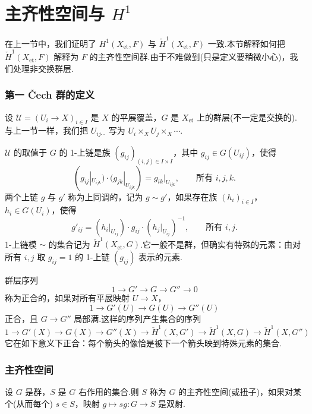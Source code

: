 ﻿%
\chapter{\texorpdfstring{主齐性空间与 $H^{1}$}{主齐性空间与 H1}}\label{sec:11}

在上一节中，我们证明了 $H^{1}(X_{\mathrm{et}}, F)$ 与 $\check{H}^{1}(X_{\mathrm{et}}, F)$ 一致.本节解释如何把 $\check{H}^{1}(X_{\mathrm{et}}, F)$ 解释为 $F$ 的主齐性空间群.由于不难做到(只是定义要稍微小心)，我们处理非交换群层.

\subsection*{第一 \v{C}ech 群的定义}

设 $\mathcal{U} = (U_i \to X)_{i \in I}$ 是 $X$ 的平展覆盖，$G$ 是 $X_{\mathrm{et}}$ 上的群层(不一定是交换的).与上一节一样，我们把 $U_{ij\cdots}$ 写为 $U_i \times_{X} U_j \times_{X} \cdots$.

$\mathcal{U}$ 的取值于 $G$ 的 1-上链是族 $(g_{ij})_{(i,j) \in I \times I}$，其中 $g_{ij} \in G(U_{ij})$，使得
\[
(g_{ij}|_{U_{ijk}}) \cdot (g_{jk}|_{U_{ijk}}) = g_{ik}|_{U_{ijk}}, \qquad \text{所有 } i, j, k.
\]
两个上链 $g$ 与 $g'$ 称为上同调的，记为 $g \sim g'$，如果存在族 $(h_i)_{i \in I}$，$h_i \in G(U_i)$，使得
\[
g'_{ij} = (h_i|_{U_{ij}}) \cdot g_{ij} \cdot (h_j|_{U_{ij}})^{-1}, \qquad \text{所有 } i, j.
\]
1-上链模 $\sim$ 的集合记为 $\check{H}^{1}(X_{\mathrm{et}}, G)$.它一般不是群，但确实有特殊的元素：由对所有 $i, j$ 取 $g_{ij} = 1$ 的 1-上链 $(g_{ij})$ 表示的元素.

群层序列
\[
1 \to G' \to G \to G'' \to 0
\]
称为正合的，如果对所有平展映射 $U \to X$，
\[
1 \to G'(U) \to G(U) \to G''(U)
\]
正合，且 $G \to G''$ 局部满.这样的序列产生集合的序列
\[
1 \to G'(X) \to G(X) \to G''(X) \to \check{H}^{1}(X, G') \to \check{H}^{1}(X, G) \to \check{H}^{1}(X, G'')
\]
它在如下意义下正合：每个箭头的像恰是被下一个箭头映到特殊元素的集合.

\subsection*{主齐性空间}

设 $G$ 是群，$S$ 是 $G$ 右作用的集合.则 $S$ 称为 $G$ 的主齐性空间(或扭子)，如果对某个(从而每个) $s \in S$，映射 $g \mapsto sg \colon G \to S$ 是双射.

